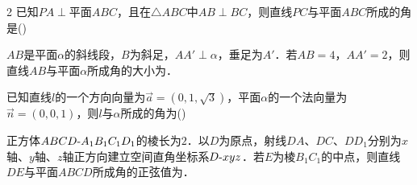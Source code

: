 \documentclass[fontset=none]{ctexart}
\begin{document}
\begin{multicols}{2}
 已知\(PA\perp\)平面\(ABC\)，且在\(\triangle ABC\)中\(AB\perp BC\)，则直线\(PC\)与平面\(ABC\)所成的角是\nobreak(\kongwei)
\begin{ansblock}[练-课时08-12]
\setlength{\anshang}{7.6mm}%
\end{ansblock}

 \(AB\)是平面\(\alpha\)的斜线段，\(B\)为斜足，\(AA'\perp\alpha\)，垂足为\(A'\)．若\(AB=4\)，\(AA'=2\)，则直线\(AB\)与平面\(\alpha\)所成角的大小为\kongbai{}．
\begin{ansblock}[练-课时08-13]
\setlength{\anshang}{7.6mm}%
\end{ansblock}

 已知直线\(l\)的一个方向向量为\(\overrightarrow{a}=(0,1,\sqrt{3})\)，平面\(\alpha\)的一个法向量为\(\overrightarrow{n}=(0,0,1)\)，则\(l\)与\(\alpha\)所成的角为\nobreak(\kongwei)
\begin{ansblock}[练-课时08-14]
\setlength{\anshang}{7.6mm}%
\end{ansblock}


 正方体\(ABCD\text{-}\penalty100 A_1B_1C_1D_1\)的棱长为\(2\)．以\(D\)为原点，射线\(DA\)、\(DC\)、\(DD_1\)分别为\(x\)轴、\(y\)轴、\(z\)轴正方向建立空间直角坐标系\(D\text{-}\penalty100 xyz\)．若\(E\)为棱\(B_1C_1\)的中点，则直线\(DE\)与平面\(ABCD\)所成角的正弦值为\kongbai{}．
\begin{ansblock}[练-课时08-15]
\setlength{\anshang}{7.6mm}%
\end{ansblock}


\end{multicols}
\end{document}
